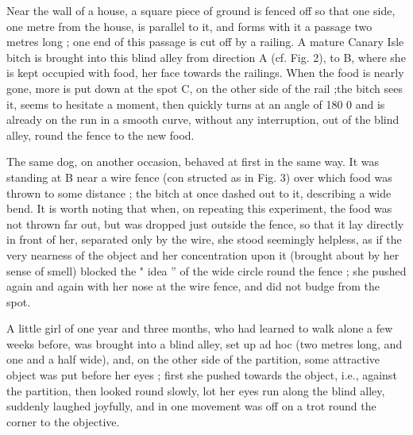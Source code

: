\documentclass{article}
\begin{document}
Near the wall of a house, a square piece of ground is fenced
off so that one side, one metre from the house, is parallel to
it, and forms with it a passage two metres long ; one end
of this passage is cut off by a railing. A mature Canary
Isle bitch is brought into this blind alley from direction A
(cf. Fig. 2), to B, where she is kept occupied with food, her
face towards the railings. When the food is nearly gone,
more is put down at the spot C, on the other side of the rail
;the bitch sees it, seems to hesitate a moment, then quickly
turns at an angle of 180 0 and is already on the run in a smooth
curve, without any interruption, out of the blind alley,
round the fence to the new food.

The same dog, on another occasion, behaved at first in
the same way. It was standing at B near a wire fence (con
structed as in Fig. 3) over which food was thrown to some
distance ; the bitch at once dashed out to it, describing a
wide bend. It is worth noting that when, on repeating this
experiment, the food was not thrown far out, but was dropped
just outside the fence, so that it lay directly in front of her,
separated only by the wire, she stood seemingly helpless,
as if the very nearness of the object and her concentration
upon it (brought about by her sense of smell) blocked the
" idea ” of the wide circle round the fence ; she pushed again
and again with her nose at the wire fence, and did not budge
from the spot.

A little girl of one year and three months, who had learned
to walk alone a few weeks before, was brought into a blind
alley, set up ad hoc (two metres long, and one and a half wide),
and, on the other side of the partition, some attractive object
was put before her eyes ; first she pushed towards the object,
i.e., against the partition, then looked round slowly, lot her
eyes run along the blind alley, suddenly laughed joyfully,
and in one movement was off on a trot round the corner
to the objective.
\end{document}
